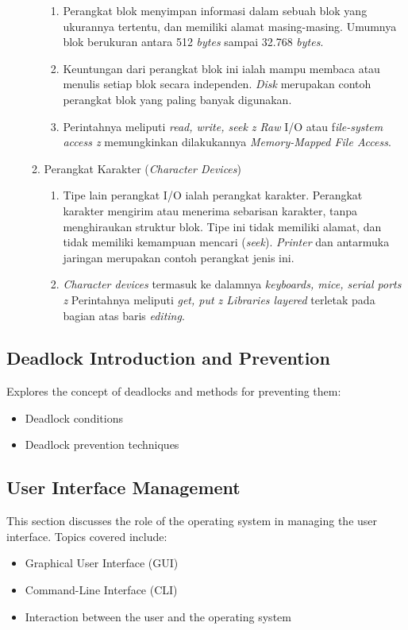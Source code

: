\documentclass[12pt]{article}
\begin{document}
\begin{enumerate}
\begin{enumerate}
\begin{enumerate}
            \item Perangkat blok menyimpan informasi dalam sebuah blok yang ukurannya tertentu, dan memiliki alamat masing-masing. Umumnya blok berukuran antara 512 \textit{bytes} sampai 32.768 \textit{bytes}.
            \item Keuntungan dari perangkat blok ini ialah mampu membaca atau menulis setiap blok secara independen. \textit{Disk} merupakan contoh perangkat blok yang paling banyak digunakan.
            \item Perintahnya meliputi \textit{read, write, seek z Raw} I/O atau f\textit{ile-system access z} memungkinkan dilakukannya \textit{Memory-Mapped File Access}.
        \end{enumerate}
        \item Perangkat Karakter (\textit{Character Devices})
        \begin{enumerate}
            \item Tipe lain perangkat I/O ialah perangkat karakter. Perangkat karakter mengirim atau menerima sebarisan karakter, tanpa menghiraukan struktur blok. Tipe ini tidak memiliki alamat, dan tidak memiliki kemampuan mencari (\textit{seek}). \textit{Printer} dan antarmuka jaringan merupakan contoh perangkat jenis ini.
            \item \textit{Character devices} termasuk ke dalamnya \textit{keyboards, mice, serial ports z} Perintahnya meliputi \textit{get, put z Libraries layered} terletak pada bagian atas baris \textit{editing}.
        \end{enumerate}
    \end{enumerate}
\end{enumerate}

\subsection{Deadlock Introduction and Prevention}
Explores the concept of deadlocks and methods for preventing them:
\begin{itemize}
    \item Deadlock conditions
    \item Deadlock prevention techniques
\end{itemize}

\subsection{User Interface Management}
This section discusses the role of the operating system in managing the user interface. Topics covered include:
\begin{itemize}
    \item Graphical User Interface (GUI)
    \item Command-Line Interface (CLI)
    \item Interaction between the user and the operating system
\end{itemize}
\end{document}
